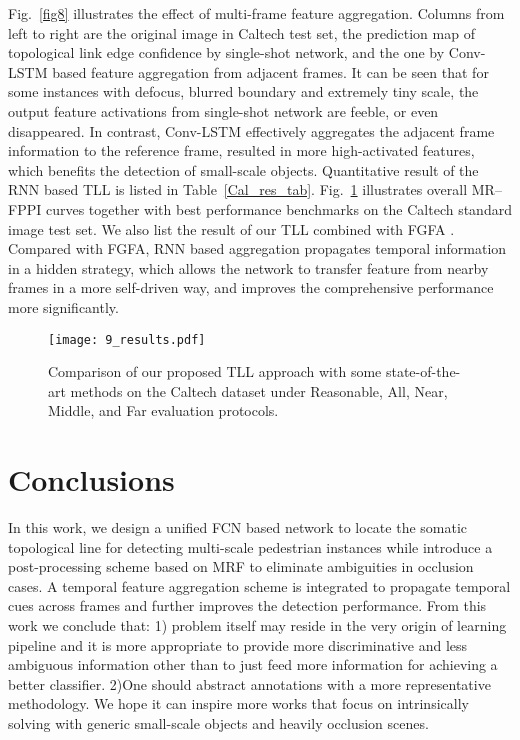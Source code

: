 \documentclass[runningheads]{llncs}
\begin{document}
Fig.~\ref{fig8} illustrates the effect of multi-frame feature aggregation. Columns from left to right are the original image in Caltech test set, the prediction map of topological link edge confidence by single-shot network, and the one by Conv-LSTM based feature aggregation from adjacent frames. It can be seen that for some instances with defocus, blurred boundary and extremely tiny scale, the output feature activations from single-shot network are feeble, or even disappeared. In contrast, Conv-LSTM effectively aggregates the adjacent frame information to the reference frame, resulted in more high-activated features, which benefits the detection of small-scale objects.
Quantitative result of the RNN based TLL is listed in Table~\ref{Cal_res_tab}. Fig.~\ref{fig9} illustrates overall MR--FPPI curves together with best performance benchmarks on the Caltech standard image test set. We also list the result of our TLL combined with FGFA \cite{FGFA}. Compared with FGFA, RNN based aggregation propagates temporal information in a hidden strategy, which allows the network to transfer feature from nearby frames in a more self-driven way, and improves the comprehensive performance more significantly.
\begin{figure}[t]
	\centering
	\texttt{[image: 9\_results.pdf]}
	\caption{Comparison of our proposed TLL approach with some state-of-the-art methods on the Caltech dataset under Reasonable, All, Near, Middle, and Far evaluation protocols.}
	\label{fig9}
\end{figure}

\section{Conclusions}
In this work, we design a unified FCN based network to locate the somatic topological line for detecting multi-scale pedestrian instances while introduce a post-processing scheme based on MRF to eliminate ambiguities in occlusion cases. A temporal feature aggregation scheme is integrated to propagate temporal cues across frames and further improves the detection performance. From this work we conclude that: 1) problem itself may reside in the very origin of learning pipeline and it is more appropriate to provide more discriminative and less ambiguous information other than to just feed more information for achieving a better classifier. 2)One should abstract annotations with a more representative methodology. We hope it can inspire more works that focus on intrinsically solving with generic small-scale objects and heavily occlusion scenes.
\end{document}
